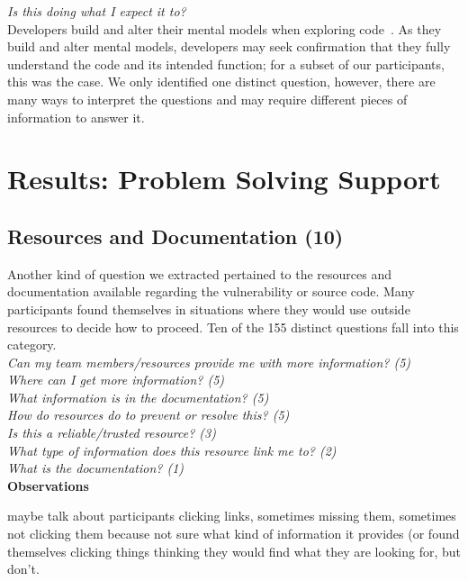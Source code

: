 \documentclass[conference]{IEEEtran}
\begin{document}
\noindent\emph{Is this doing what I expect it to?} \\
Developers build and alter their mental models when exploring code~\cite{canas1994mental, burkhardt1997mental}. 
As they build and alter mental models, developers may seek confirmation that they fully understand the code and its intended function; for a subset of our participants, this was the case. 
We only identified one distinct question, however, there are many ways to interpret the questions and may require different pieces of information to answer it.



\section{Results: Problem Solving Support}
\label{sec:results-pss}



\noindent\subsection{\textbf{Resources and Documentation (10)}}\label{rd}


Another kind of question we extracted pertained to the resources and documentation available regarding the vulnerability or source code. 
Many participants found themselves in situations where they would use outside resources to decide how to proceed. 
Ten of the 155 distinct questions fall into this category. 
\\

\noindent\emph{Can my team members/resources provide me with more information? (5)} \\
\emph{Where can I get more information? (5)} \\
\emph{What information is in the documentation? (5)} \\
\emph{How do resources do to prevent or resolve this? (5)} \\
\emph{Is this a reliable/trusted resource? (3)} \\
\emph{What type of information does this resource link me to? (2)} \\
\emph{What is the documentation? (1)} \\



\noindent\textbf{Observations}

maybe talk about participants clicking links, sometimes missing them, sometimes not clicking them because not sure what kind of information it provides (or found themselves clicking things thinking they would find what they are looking for, but don't.
\\
\end{document}
